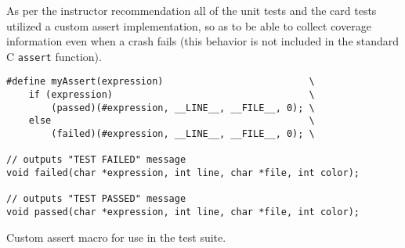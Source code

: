 \documentclass[11pt]{article}
\begin{document}
As per the instructor recommendation all of the unit tests and the card tests utilized a custom assert implementation, so as to be able to collect coverage information even when a crash fails (this behavior is not included in the standard C \texttt{assert} function).

\begin{listing}[htbp]
\begin{verbatim}
#define myAssert(expression)                          \
    if (expression)                                   \
        (passed)(#expression, __LINE__, __FILE__, 0); \
    else                                              \
        (failed)(#expression, __LINE__, __FILE__, 0); \

// outputs "TEST FAILED" message
void failed(char *expression, int line, char *file, int color);

// outputs "TEST PASSED" message
void passed(char *expression, int line, char *file, int color);
\end{verbatim}
\caption{Custom assert macro for use in the test suite.}
\end{listing}
\end{document}
